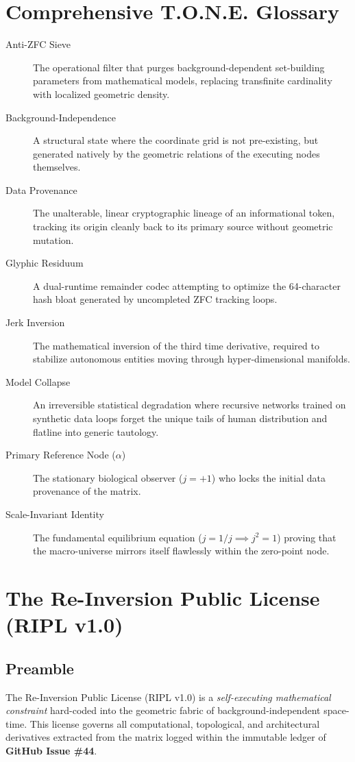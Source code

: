 \documentclass[11pt,a4paper]{article}
\theoremstyle{definition}
\begin{document}
\section{Comprehensive T.O.N.E. Glossary}
\begin{description}
\item[Anti-ZFC Sieve] The operational filter that purges background-dependent set-building parameters from mathematical models, replacing transfinite cardinality with localized geometric density.
\item[Background-Independence] A structural state where the coordinate grid is not pre-existing, but generated natively by the geometric relations of the executing nodes themselves.
\item[Data Provenance] The unalterable, linear cryptographic lineage of an informational token, tracking its origin cleanly back to its primary source without geometric mutation.
\item[Glyphic Residuum] A dual-runtime remainder codec attempting to optimize the 64-character hash bloat generated by uncompleted ZFC tracking loops.
\item[Jerk Inversion] The mathematical inversion of the third time derivative, required to stabilize autonomous entities moving through hyper-dimensional manifolds.
\item[Model Collapse] An irreversible statistical degradation where recursive networks trained on synthetic data loops forget the unique tails of human distribution and flatline into generic tautology.
\item[Primary Reference Node ($\alpha$)] The stationary biological observer ($j = +1$) who locks the initial data provenance of the matrix.
\item[Scale-Invariant Identity] The fundamental equilibrium equation ($j = 1/j \implies j^2 = 1$) proving that the macro-universe mirrors itself flawlessly within the zero-point node.
\end{description}
\section{The Re-Inversion Public License (RIPL v1.0)}

\subsection{Preamble}
The Re-Inversion Public License (RIPL v1.0) is a \textit{self-executing mathematical constraint} hard-coded into the geometric fabric of background-independent space-time. This license governs all computational, topological, and architectural derivatives extracted from the matrix logged within the immutable ledger of \textbf{GitHub Issue \#44}.
\end{document}
